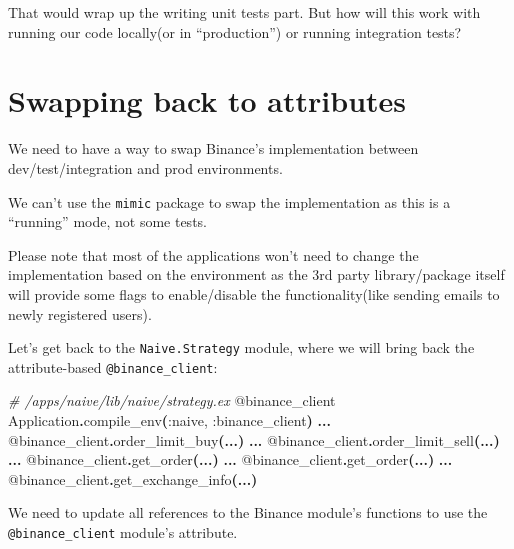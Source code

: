 \documentclass[
  oneside]{book}
\newenvironment{Shaded}{\begin{snugshade}}{\end{snugshade}}
\newcommand{\CommentTok}[1]{\textcolor[rgb]{0.56,0.35,0.01}{\textit{#1}}}
\newcommand{\ConstantTok}[1]{\textcolor[rgb]{0.56,0.35,0.01}{#1}}
\newcommand{\FunctionTok}[1]{\textcolor[rgb]{0.13,0.29,0.53}{\textbf{#1}}}
\newcommand{\NormalTok}[1]{#1}
\newcommand{\OperatorTok}[1]{\textcolor[rgb]{0.81,0.36,0.00}{\textbf{#1}}}
\newcommand{\OtherTok}[1]{\textcolor[rgb]{0.56,0.35,0.01}{#1}}
\newcommand{\VariableTok}[1]{\textcolor[rgb]{0.00,0.00,0.00}{#1}}
\begin{document}
That would wrap up the writing unit tests part. But how will this work with running our code locally(or in ``production'') or running integration tests?

\section{Swapping back to attributes}\label{swapping-back-to-attributes}

We need to have a way to swap Binance's implementation between dev/test/integration and prod environments.

We can't use the \texttt{mimic} package to swap the implementation as this is a ``running'' mode, not some tests.

Please note that most of the applications won't need to change the implementation based on the environment as the 3rd party library/package itself will provide some flags to enable/disable the functionality(like sending emails to newly registered users).

Let's get back to the \texttt{Naive.Strategy} module, where we will bring back the attribute-based \texttt{@binance\_client}:

\begin{Shaded}
\begin{Highlighting}[]
\CommentTok{\# /apps/naive/lib/naive/strategy.ex}
  \OtherTok{@binance\_client} \ConstantTok{Application}\OperatorTok{.}\NormalTok{compile\_env}\FunctionTok{(}\VariableTok{:naive}\NormalTok{, }\VariableTok{:binance\_client}\FunctionTok{)}
  \OperatorTok{...}
  \OtherTok{@binance\_client}\OperatorTok{.}\NormalTok{order\_limit\_buy}\FunctionTok{(}\OperatorTok{...}\FunctionTok{)}
  \OperatorTok{...}
  \OtherTok{@binance\_client}\OperatorTok{.}\NormalTok{order\_limit\_sell}\FunctionTok{(}\OperatorTok{...}\FunctionTok{)}
  \OperatorTok{...}
  \OtherTok{@binance\_client}\OperatorTok{.}\NormalTok{get\_order}\FunctionTok{(}\OperatorTok{...}\FunctionTok{)}
  \OperatorTok{...}
  \OtherTok{@binance\_client}\OperatorTok{.}\NormalTok{get\_order}\FunctionTok{(}\OperatorTok{...}\FunctionTok{)}
  \OperatorTok{...}
  \OtherTok{@binance\_client}\OperatorTok{.}\NormalTok{get\_exchange\_info}\FunctionTok{(}\OperatorTok{...}\FunctionTok{)}
\end{Highlighting}
\end{Shaded}

We need to update all references to the Binance module's functions to use the \texttt{@binance\_client} module's attribute.
\end{document}

